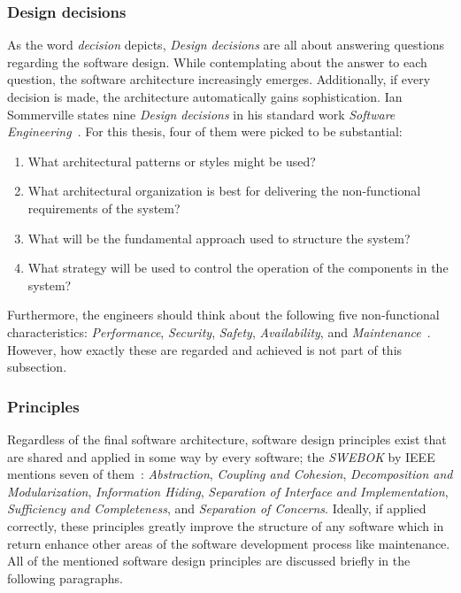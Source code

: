 \documentclass[12pt,a4paper,twoside]{report}
\begin{document}
\subsubsection{Design decisions}

As the word \textit{decision} depicts, \textit{Design decisions} are all about
answering questions regarding the software design. While contemplating about
the answer to each question, the software architecture increasingly emerges.
Additionally, if every decision is made, the architecture automatically gains
sophistication. Ian Sommerville states nine \textit{Design decisions} in his
standard work \textit{Software Engineering}~\cite{sommerville-se}.
For this thesis, four of them were picked to be substantial:
\begin{enumerate}
\item What architectural patterns or styles might be used?
\item What architectural organization is best for delivering the non-functional requirements of the system?
\item What will be the fundamental approach used to structure the system?
\item What strategy will be used to control the operation of the components in the system?
\end{enumerate}
Furthermore, the engineers should think about the following five non-functional characteristics:
\textit{Performance}, \textit{Security}, \textit{Safety}, \textit{Availability},
and \textit{Maintenance}~\cite{sommerville-se}. However, how exactly these are
regarded and achieved is not part of this subsection.


\subsubsection{Principles}

Regardless of the final software architecture, software design principles exist
that are shared and applied in some way by every software; the \textit{SWEBOK} by IEEE
mentions seven of them~\cite{swebok}: \textit{Abstraction}, \textit{Coupling and Cohesion},
\textit{Decomposition and Modularization}, \textit{Information Hiding},
\textit{Separation of Interface and Implementation},
\textit{Sufficiency and Completeness}, and \textit{Separation of Concerns}.
Ideally, if applied correctly, these principles greatly improve the structure
of any software which in return enhance other areas of the
software development process like maintenance. All of the mentioned
software design principles are discussed briefly in the following paragraphs.
\end{document}
